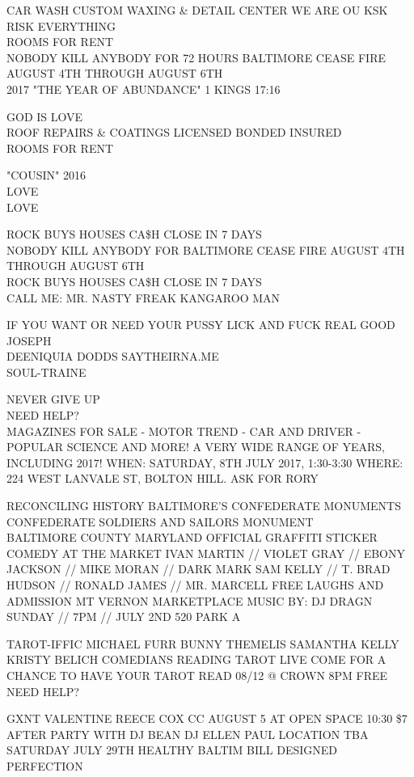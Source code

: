 \documentclass[10pt,letterpaper]{article}
\begin{document}
CAR WASH CUSTOM WAXING \& DETAIL CENTER WE ARE OU KSK RISK EVERYTHING\\
ROOMS FOR RENT\\
NOBODY KILL ANYBODY FOR 72 HOURS BALTIMORE CEASE FIRE AUGUST 4TH THROUGH AUGUST 6TH\\
2017 "THE YEAR OF ABUNDANCE" 1 KINGS 17:16

GOD IS LOVE\\
ROOF REPAIRS \& COATINGS LICENSED BONDED INSURED\\
ROOMS FOR RENT

"COUSIN" 2016\\
LOVE\\
LOVE

ROCK BUYS HOUSES CA\$H CLOSE IN 7 DAYS\\
NOBODY KILL ANYBODY FOR BALTIMORE CEASE FIRE AUGUST 4TH THROUGH AUGUST 6TH\\
ROCK BUYS HOUSES CA\$H CLOSE IN 7 DAYS\\
CALL ME: MR. NASTY FREAK KANGAROO MAN

IF YOU WANT OR NEED YOUR PUSSY LICK AND FUCK REAL GOOD JOSEPH\\
DEENIQUIA DODDS SAYTHEIRNA.ME\\
SOUL{-}TRAINE

NEVER GIVE UP\\
NEED HELP?\\
MAGAZINES FOR SALE {-} MOTOR TREND {-} CAR AND DRIVER {-} POPULAR SCIENCE AND MORE!  A VERY WIDE RANGE OF YEARS, INCLUDING 2017!  WHEN: SATURDAY, 8TH JULY 2017, 1:30{-}3:30 WHERE: 224 WEST LANVALE ST, BOLTON HILL.  ASK FOR RORY

RECONCILING HISTORY BALTIMORE'S CONFEDERATE MONUMENTS CONFEDERATE SOLDIERS AND SAILORS MONUMENT\\
BALTIMORE COUNTY MARYLAND OFFICIAL GRAFFITI STICKER\\
COMEDY AT THE MARKET IVAN MARTIN // VIOLET GRAY  // EBONY JACKSON // MIKE MORAN // DARK MARK SAM KELLY // T. BRAD HUDSON // RONALD JAMES // MR. MARCELL FREE LAUGHS AND ADMISSION MT VERNON MARKETPLACE MUSIC BY: DJ DRAGN SUNDAY // 7PM // JULY 2ND 520 PARK A

TAROT{-}IFFIC MICHAEL FURR BUNNY THEMELIS SAMANTHA KELLY KRISTY BELICH COMEDIANS READING TAROT LIVE COME FOR A CHANCE TO HAVE YOUR TAROT READ 08/12 @ CROWN 8PM FREE\\
NEED HELP?

GXNT VALENTINE REECE COX CC AUGUST 5 AT OPEN SPACE 10:30 \$7 AFTER PARTY WITH DJ BEAN DJ ELLEN PAUL LOCATION TBA\\
SATURDAY JULY 29TH HEALTHY BALTIM BILL DESIGNED PERFECTION
\end{document}
